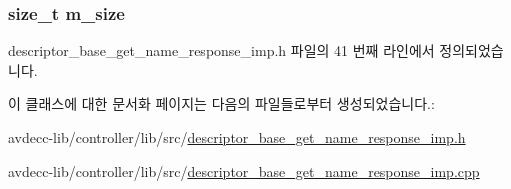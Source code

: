 \subsubsection[{\texorpdfstring{m\+\_\+size}{m_size}}]{\setlength{\rightskip}{0pt plus 5cm}size\+\_\+t m\+\_\+size\hspace{0.3cm}{\ttfamily [private]}}\hypertarget{classavdecc__lib_1_1descriptor__base__get__name__response__imp_a0dc3c363255f193681c77b4d2a82e995}{}\label{classavdecc__lib_1_1descriptor__base__get__name__response__imp_a0dc3c363255f193681c77b4d2a82e995}


descriptor\+\_\+base\+\_\+get\+\_\+name\+\_\+response\+\_\+imp.\+h 파일의 41 번째 라인에서 정의되었습니다.



이 클래스에 대한 문서화 페이지는 다음의 파일들로부터 생성되었습니다.\+:\begin{DoxyCompactItemize}
\item 
avdecc-\/lib/controller/lib/src/\hyperlink{descriptor__base__get__name__response__imp_8h}{descriptor\+\_\+base\+\_\+get\+\_\+name\+\_\+response\+\_\+imp.\+h}\item 
avdecc-\/lib/controller/lib/src/\hyperlink{descriptor__base__get__name__response__imp_8cpp}{descriptor\+\_\+base\+\_\+get\+\_\+name\+\_\+response\+\_\+imp.\+cpp}\end{DoxyCompactItemize}
